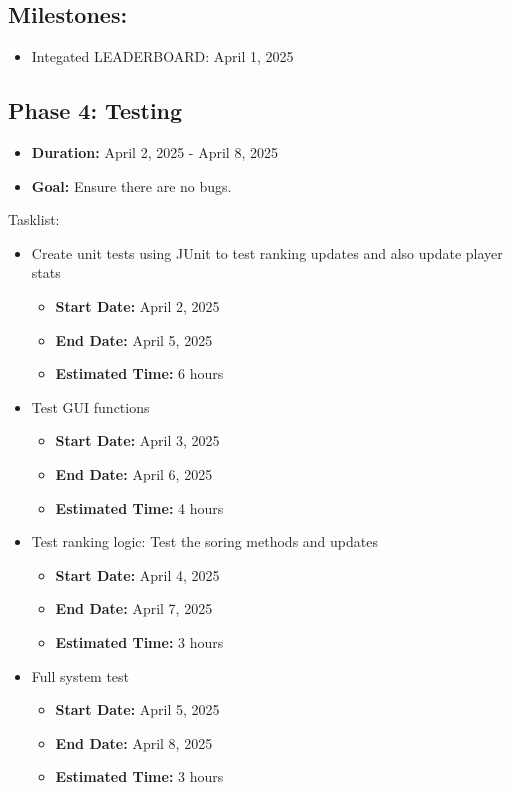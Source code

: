 \documentclass{report}
\begin{document}
\subsection*{Milestones:}
\begin{itemize}
    \item Integated LEADERBOARD: April 1, 2025
\end{itemize}
\subsection*{Phase 4: Testing}
\begin{itemize}
    \item \textbf{Duration:} April 2, 2025 - April 8, 2025
    \item \textbf{Goal:} Ensure there are no bugs.
\end{itemize}
Tasklist:
\begin{itemize}
    \item Create unit tests using JUnit to test ranking updates and also update player stats
    \begin{itemize}
        \item \textbf{Start Date:} April 2, 2025
        \item \textbf{End Date:} April 5, 2025
        \item \textbf{Estimated Time:} 6 hours
    \end{itemize}
    \item Test GUI functions
    \begin{itemize}
        \item \textbf{Start Date:} April 3, 2025
        \item \textbf{End Date:} April 6, 2025
        \item \textbf{Estimated Time:} 4 hours
    \end{itemize}
    \item Test ranking logic: Test the soring methods and updates
    \begin{itemize}
        \item \textbf{Start Date:} April 4, 2025
        \item \textbf{End Date:} April 7, 2025
        \item \textbf{Estimated Time:} 3 hours
    \end{itemize}
    \item Full system test
    \begin{itemize}
        \item \textbf{Start Date:} April 5, 2025
        \item \textbf{End Date:} April 8, 2025
        \item \textbf{Estimated Time:} 3 hours
    \end{itemize}
\end{itemize}
\end{document}
